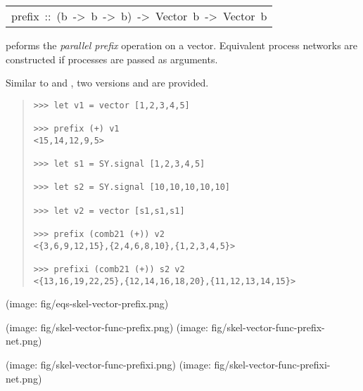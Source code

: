\begin{haddockdesc}
\item[\begin{tabular}{@{}l}
prefix\ ::\ (b\ ->\ b\ ->\ b)\ ->\ Vector\ b\ ->\ Vector\ b
\end{tabular}]\haddockbegindoc
{} peforms the \emph{parallel prefix} operation on a vector.
 Equivalent process networks are constructed if processes are passed
 as arguments.\par
Similar to  and , two versions  and
  are provided.\par
\begin{quote}
{\haddockverb\begin{verbatim}
>>> let v1 = vector [1,2,3,4,5]

>>> prefix (+) v1
<15,14,12,9,5>

>>> let s1 = SY.signal [1,2,3,4,5]

>>> let s2 = SY.signal [10,10,10,10,10]

>>> let v2 = vector [s1,s1,s1]

>>> prefix (comb21 (+)) v2
<{3,6,9,12,15},{2,4,6,8,10},{1,2,3,4,5}>

>>> prefixi (comb21 (+)) s2 v2
<{13,16,19,22,25},{12,14,16,18,20},{11,12,13,14,15}>

\end{verbatim}}
\end{quote}(image: fig/eqs-skel-vector-prefix.png)\par
           (image: fig/skel-vector-func-prefix.png)
 (image: fig/skel-vector-func-prefix-net.png)\par
           (image: fig/skel-vector-func-prefixi.png)
 (image: fig/skel-vector-func-prefixi-net.png)\par
           
\end{haddockdesc}
